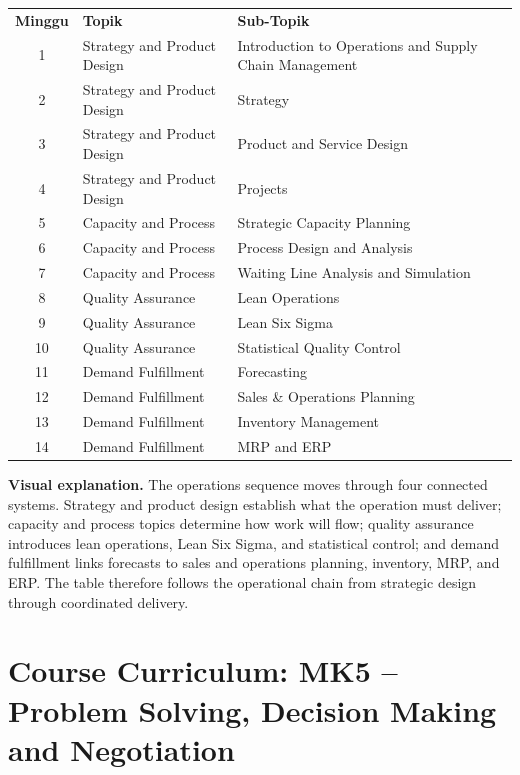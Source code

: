 \documentclass[10pt]{article}
\newcommand{\visualexplanation}[1]{%
  \begin{tcolorbox}[colback=lightgray,colframe=navy!35,boxrule=0.5pt,
    arc=2mm,left=2mm,right=2mm,top=1.5mm,bottom=1.5mm]
  \textbf{Visual explanation.} #1
  \end{tcolorbox}}
\begin{document}
\begin{center}\small
\begin{tabularx}{\textwidth}{c L{5.0cm} Y}
\color{white}\bfseries Minggu & \color{white}\bfseries Topik & \color{white}\bfseries Sub-Topik\\
1 & Strategy and Product Design & Introduction to Operations and Supply Chain Management\\
2 & Strategy and Product Design & Strategy\\
3 & Strategy and Product Design & Product and Service Design\\
4 & Strategy and Product Design & Projects\\
5 & Capacity and Process & Strategic Capacity Planning\\
6 & Capacity and Process & Process Design and Analysis\\
7 & Capacity and Process & Waiting Line Analysis and Simulation\\
8 & Quality Assurance & Lean Operations\\
9 & Quality Assurance & Lean Six Sigma\\
10 & Quality Assurance & Statistical Quality Control\\
11 & Demand Fulfillment & Forecasting\\
12 & Demand Fulfillment & Sales \& Operations Planning\\
13 & Demand Fulfillment & Inventory Management\\
14 & Demand Fulfillment & MRP and ERP\\
\end{tabularx}
\end{center}

\visualexplanation{The operations sequence moves through four connected systems. Strategy and product design establish what the operation must deliver; capacity and process topics determine how work will flow; quality assurance introduces lean operations, Lean Six Sigma, and statistical control; and demand fulfillment links forecasts to sales and operations planning, inventory, MRP, and ERP. The table therefore follows the operational chain from strategic design through coordinated delivery.}

\section{Course Curriculum: MK5 -- Problem Solving, Decision Making and Negotiation}
\end{document}
